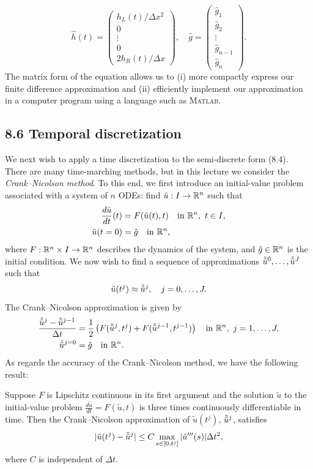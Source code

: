 \[\hat{h}(t) = \begin{pmatrix} h_L(t)/\Delta x^2 \\ 0 \\ \vdots \\ 0 \\ 2h_R(t)/\Delta x \end{pmatrix}, \quad \hat{g} = \begin{pmatrix} \hat{g}_1 \\ \hat{g}_2 \\ \vdots \\ \hat{g}_{n-1} \\ \hat{g}_n \end{pmatrix}.\]
The matrix form of the equation allows us to (i) more compactly express our finite difference approximation and (ii) efficiently implement our approximation in a computer program using a language such as \textsc{Matlab}.

\subsection{8.6 Temporal discretization}
We next wish to apply a time discretization to the semi-discrete form (8.4). There are many time-marching methods, but in this lecture we consider the \textit{Crank--Nicolson method}. To this end, we first introduce an initial-value problem associated with a system of $n$ ODEs: find $\tilde{u} : I \to \mathbb{R}^n$ such that
\begin{align*}
    \frac{d\tilde{u}}{dt}(t) &= F(\tilde{u}(t), t) \quad \text{in } \mathbb{R}^n, \ t \in I, \\
    \tilde{u}(t = 0) &= \hat{g} \quad \text{in } \mathbb{R}^n,
\end{align*}
where $F : \mathbb{R}^n \times I \to \mathbb{R}^n$ describes the dynamics of the system, and $\hat{g} \in \mathbb{R}^n$ is the initial condition. We now wish to find a sequence of approximations $\tilde{\tilde{u}}^0, \dots, \tilde{\tilde{u}}^J$ such that
\[\tilde{u}(t^j) \approx \tilde{\tilde{u}}^j, \quad j = 0, \dots, J.\]
The Crank--Nicolson approximation is given by
\begin{align*}
    \frac{\tilde{\tilde{u}}^j - \tilde{\tilde{u}}^{j-1}}{\Delta t} &= \frac{1}{2} \left(F(\tilde{\tilde{u}}^j, t^j) + F(\tilde{\tilde{u}}^{j-1}, t^{j-1})\right) \quad \text{in } \mathbb{R}^n, \ j = 1, \dots, J, \\
    \tilde{\tilde{u}}^{j=0} &= \hat{g} \quad \text{in } \mathbb{R}^n.
\end{align*}
As regards the accuracy of the Crank--Nicolson method, we have the following result:

\begin{proposition}[][8.5]
    Suppose $F$ is Lipschitz continuous in its first argument and the solution $\tilde{u}$ to the initial-value problem $\frac{d\tilde{u}}{dt} = F(\tilde{u}, t)$ is three times continuously differentiable in time. Then the Crank--Nicolson approximation of $\tilde{u}(t^j)$, $\tilde{\tilde{u}}^j$, satisfies
    \[|\tilde{u}(t^j) - \tilde{\tilde{u}}^j| \leq C \max_{s \in [0, t^j]} |\tilde{u}'''(s)| \Delta t^2,\]
    where $C$ is independent of $\Delta t$.
\end{proposition}

